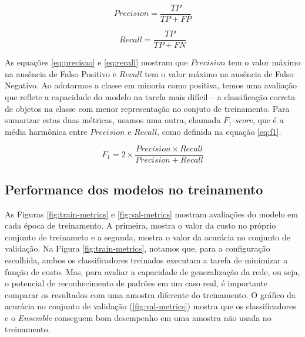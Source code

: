 \begin{equation}
  \label{eq:precisao}
  Precision = \frac{TP}{TP + FP}
\end{equation}

\begin{equation}
  \label{eq:recall}
  Recall = \frac{TP}{TP + FN}
\end{equation}

As equações \eqref{eq:precisao} e \eqref{eq:recall} mostram que $Precision$ tem o valor máximo na ausência de Falso Positivo e $Recall$ tem o valor máximo na ausência de Falso Negativo. Ao adotarmos a classe em minoria como positiva, temos uma avaliação que reflete a capacidade do modelo na tarefa mais difícil -- a classificação correta de objetos na classe com menor representação no conjuto de treinamento.
Para sumarizar estas duas métricas, usamos uma outra, chamada $F_1$\emph{-score}, que é a média harmônica entre $Precision$ e $Recall$, como definida na equação \eqref{eq:f1}.

\begin{equation}
  \label{eq:f1}
  F_1 = 2 \times \frac{Precision \times Recall}{Precision + Recall}
\end{equation}

\newpage
\subsection{Performance dos modelos no treinamento}
\label{section:result-treinamento}



As Figuras \ref{fig:train-metrics} e \ref{fig:val-metrics} mostram avaliações do modelo em cada época de treinamento. A primeira, mostra o valor da custo no próprio conjunto de treinameto e a segunda, mostra o valor da acurácia no conjunto de validação. Na Figura \ref{fig:train-metrics}, notamos que, para a configuração escolhida, ambos os classificadores treinados executam a tarefa de minimizar a função de custo. Mas, para avaliar a capacidade de generalização da rede, ou seja, o potencial de reconhecimento de padrões em um caso real, é importante comparar os resultados com uma amostra diferente do treinamento. O gráfico da acurácia no conjunto de validação (\ref{fig:val-metrics}) mostra que os classificadores e o \emph{Ensemble} conseguem bom desempenho em uma amostra não usada no treinamento.

